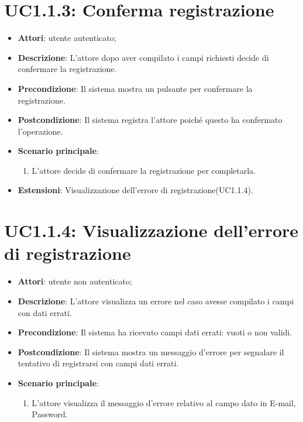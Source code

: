 \section{UC1.1.3: Conferma registrazione}
\label{UC1.1.3}
\begin{itemize}
	\item \textbf{Attori}: utente autenticato;
	\item \textbf{Descrizione}: L'attore dopo aver compilato i campi richiesti decide di confermare la registrazione.
	\item \textbf{Precondizione}: Il sistema mostra un pulsante per confermare la registrazione.
	\item \textbf{Postcondizione}: Il sistema registra l'attore poiché questo ha confermato l'operazione.
	\item \textbf{Scenario principale}:
	\begin{enumerate} \item L'attore decide di confermare la registrazione per completarla.\end{enumerate}
	\item \textbf{Estensioni}:
	Visualizzazione dell'errore di registrazione(UC1.1.4).
\end{itemize}

\section{UC1.1.4: Visualizzazione dell'errore di registrazione}
\label{UC1.1.4}
\begin{itemize}
	\item \textbf{Attori}: utente non autenticato;
	\item \textbf{Descrizione}: L'attore visualizza un errore nel caso avesse compilato i campi con dati errati.
	\item \textbf{Precondizione}: Il sistema ha ricevuto campi dati errati: vuoti o non validi.
	\item \textbf{Postcondizione}: Il sistema mostra un messaggio d'errore per segnalare il tentativo di registrarsi con campi dati errati.
	\item \textbf{Scenario principale}:
	\begin{enumerate} \item L'attore visualizza il messaggio d'errore relativo al campo dato in E-mail, Password.\end{enumerate}
\end{itemize}

